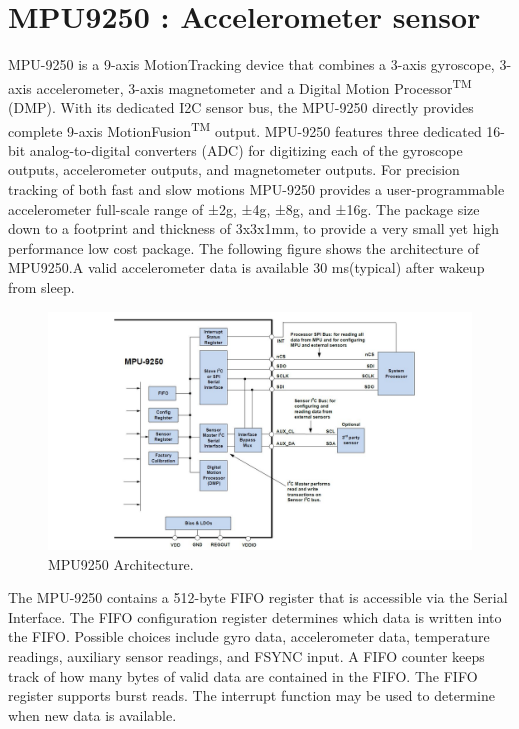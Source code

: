 \section{MPU9250 : Accelerometer sensor}\label{mpu9250_def}
MPU-9250 is a 9-axis MotionTracking device that combines a 3-axis gyroscope, 3-axis accelerometer, 3-axis magnetometer and a Digital Motion Processor\textsuperscript{TM} (DMP). With its dedicated I2C sensor bus, the MPU-9250 directly provides complete 9-axis MotionFusion\textsuperscript{TM} output. MPU-9250 features three dedicated 16-bit analog-to-digital converters (ADC) for digitizing each of the gyroscope outputs, accelerometer outputs, and magnetometer outputs. For precision tracking of both fast and slow motions MPU-9250 provides a user-programmable accelerometer full-scale range of ±2g, ±4g, ±8g, and ±16g. The package size down to a footprint and thickness of 3x3x1mm, to provide a very small yet high performance low cost package. The following figure shows the architecture of MPU9250.A valid accelerometer data is available 30 ms(typical) after wakeup from sleep.
\begin{figure}[h]
	\centering
	\includegraphics[scale = 0.6]{MPU9250.JPG}
	\caption{MPU9250 Architecture. \cite{mpu}\label{mpu9250}}
\end{figure}

The MPU-9250 contains a 512-byte FIFO register that is accessible via the Serial Interface. The FIFO configuration register determines which data is written into the FIFO. Possible choices include gyro data, accelerometer data, temperature readings, auxiliary sensor readings, and FSYNC input. A FIFO counter keeps track of how many bytes of valid data are contained in the FIFO. The FIFO register supports burst reads. The interrupt function may be used to determine when new data is available. 

